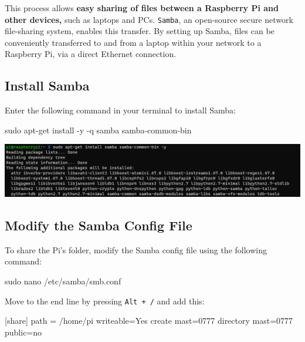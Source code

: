 \documentclass[
  letterpaper,
]{scrbook}
\newenvironment{Shaded}{\begin{snugshade}}{\end{snugshade}}
\newcommand{\AttributeTok}[1]{\textcolor[rgb]{0.40,0.45,0.13}{#1}}
\newcommand{\FunctionTok}[1]{\textcolor[rgb]{0.28,0.35,0.67}{#1}}
\newcommand{\NormalTok}[1]{\textcolor[rgb]{0.00,0.23,0.31}{#1}}
\newcommand{\OperatorTok}[1]{\textcolor[rgb]{0.37,0.37,0.37}{#1}}
\begin{document}
This process allows \textbf{easy sharing of files between a Raspberry Pi
and other devices,} such as laptops and PCs. \texttt{Samba}, an
open-source secure network file-sharing system, enables this transfer.
By setting up Samba, files can be conveniently transferred to and from a
laptop within your network to a Raspberry Pi, via a direct Ethernet
connection.

\hypertarget{install-samba}{%
\subsection{Install Samba}\label{install-samba}}

Enter the following command in your terminal to install Samba:

\begin{Shaded}
\begin{Highlighting}[]
\FunctionTok{sudo}\NormalTok{ apt{-}get install }\AttributeTok{{-}y} \AttributeTok{{-}q}\NormalTok{ samba samba{-}common{-}bin}
\end{Highlighting}
\end{Shaded}

\includegraphics{content/material/ch2/install_samba.png}

\hypertarget{modify-the-samba-config-file}{%
\subsection{Modify the Samba Config
File}\label{modify-the-samba-config-file}}

To share the Pi's folder, modify the Samba config file using the
following command:

\begin{Shaded}
\begin{Highlighting}[]
\FunctionTok{sudo}\NormalTok{ nano /etc/samba/smb.conf}
\end{Highlighting}
\end{Shaded}

Move to the end line by pressing \texttt{Alt\ +\ /} and add this:

\begin{Shaded}
\begin{Highlighting}[]
\OperatorTok{[}\NormalTok{share}\OperatorTok{]}
\NormalTok{path }\OperatorTok{=} \OperatorTok{/}\NormalTok{home}\OperatorTok{/}\NormalTok{pi}
\NormalTok{writeable}\OperatorTok{=}\NormalTok{Yes}
\NormalTok{create mast}\OperatorTok{=}\NormalTok{0777}
\NormalTok{directory mast}\OperatorTok{=}\NormalTok{0777}
\NormalTok{public}\OperatorTok{=}\NormalTok{no}
\end{Highlighting}
\end{Shaded}
\end{document}
